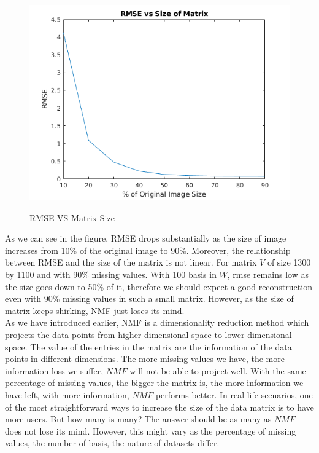 \documentclass[11pt]{article} %
\begin{document}
\begin{figure}[H] 
\centering
  \begin{minipage}[H]{0.65\linewidth}\label{ m1cv1} 
    \includegraphics[width=\linewidth]{matrixSize.png} 
    \centering
    \caption{RMSE VS Matrix Size} 
  \end{minipage} 
\end{figure}
As we can see in the figure, RMSE drops substantially as the size of image increases from 10\% of the original image to 90\%. Moreover, the relationship between RMSE and the size of the matrix is not linear. For matrix $V$ of size 1300 by 1100 and with 90\% missing values. With 100 basis in $W$, rmse remains low as the size goes down to 50\% of it, therefore we should expect a good reconstruction even with 90\% missing values in such a small matrix. However, as the size of matrix keeps shirking, NMF just loses its mind. \\
As we have introduced earlier, NMF is a dimensionality reduction method which projects the data points from higher dimensional space to lower dimensional space. The value of the entries in the matrix are the information of the data points in different dimensions. The more missing values we have, the more information loss we suffer, $NMF$ will not be able to project well. With the same percentage of missing values, the bigger the matrix is, the more information we have left, with more information, $NMF$ performs better. In real life scenarios, one of the most straightforward ways to increase the size of the data matrix is to have more users. But how many is many? The answer should be as many as $NMF$ does not lose its mind. However, this might vary as the percentage of missing values, the number of basis, the nature of datasets differ.
\end{document}
